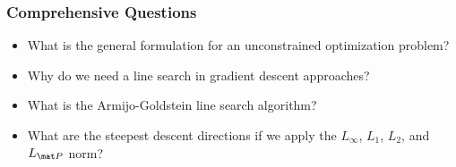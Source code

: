\begin{frame}
  \frametitle{Comprehensive Questions}

  \begin{itemize}
    \item What is the general formulation for an unconstrained optimization problem? \\[.5cm]
    \item Why do we need a line search in gradient descent approaches? \\[.5cm]
    \item What is the Armijo-Goldstein line search algorithm? \\[.5cm]
    \item What are the steepest descent directions if we apply the $L_\infty$, $L_1$, $L_2$, and $L_{\mat P}$ norm?
  \end{itemize}
\end{frame}
